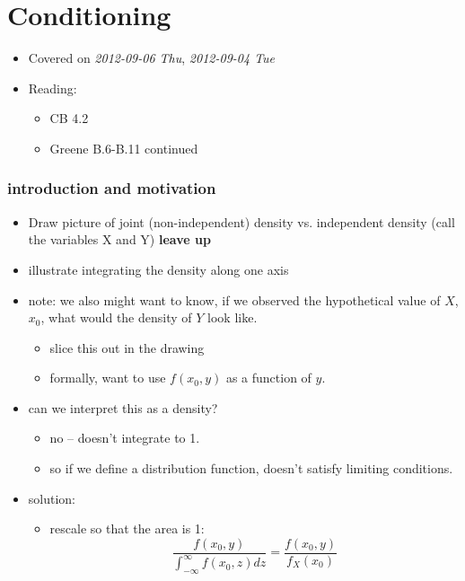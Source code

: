 
\part*{Conditioning}%

\begin{itemize}
\item Covered on \textit{2012-09-06 Thu}, \textit{2012-09-04 Tue}
\item Reading:
\begin{itemize}
\item CB 4.2
\item Greene B.6-B.11 continued
\end{itemize}
\end{itemize}
\section{introduction and motivation}
\label{sec-1}

\begin{itemize}
\item Draw picture of joint (non-independent) density vs. independent
      density (call the variables X and Y) \textbf{leave up}
\item illustrate integrating the density along one axis
\item note: we also might want to know, if we observed the hypothetical
      value of $X$, $x_0$, what would the density of $Y$ look like.
\begin{itemize}
\item slice this out in the drawing
\item formally, want to use $f(x_0, y)$ as a function of $y$.
\end{itemize}
\item can we interpret this as a density?
\begin{itemize}
\item no -- doesn't integrate to 1.
\item so if we define a distribution function, doesn't satisfy
        limiting conditions.
\end{itemize}
\item solution:
\begin{itemize}
\item rescale so that the area is 1:
        \[ \frac{f(x_0, y)}{\int_{-\infty}^{\infty} f(x_0, z) dz} =
        \frac{f(x_0, y)}{f_X(x_0)}\]
\end{itemize}
\end{itemize}
